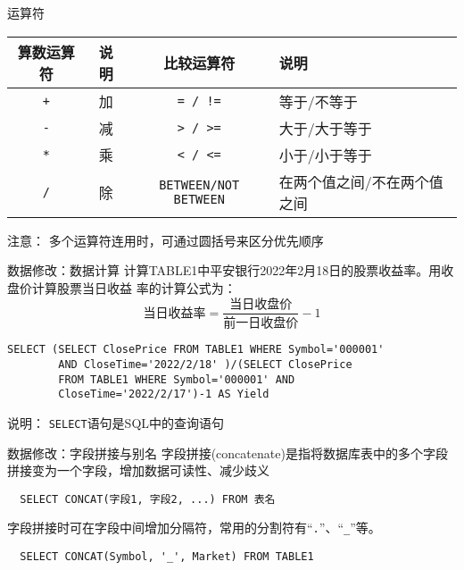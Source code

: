 \documentclass[t]{beamer}
\begin{document}
\begin{frame}[fragile]{运算符}
\begin{center}
\begin{tabular}{cccp{}}
  \hline
  算数运算符&说明&比较运算符&说明\\
  \hline
  \verb|+| &加&\verb|= / !=|& 等于/不等于\\
  \verb|-| &减&\verb|> / >=|& 大于/大于等于\\
  \verb|*| &乘&\verb|< / <=| &小于/小于等于\\
  \verb|/| &除&\verb|BETWEEN/NOT BETWEEN|& 在两个值之间/不在两个值之间  \\
  \hline
\end{tabular}
\end{center}

\begin{block}{注意：}
  多个运算符连用时，可通过圆括号来区分优先顺序
\end{block}
\end{frame}


\begin{frame}[fragile]{数据修改：数据计算}
  计算TABLE1中平安银行2022年2月18日的股票收益率。用收盘价计算股票当日收益
  率的计算公式为：
\[\text{当日收益率}=\frac{\text{当日收盘价}}{\text{前一日收盘价}}-1 \]
\begin{lstlisting}
SELECT (SELECT ClosePrice FROM TABLE1 WHERE Symbol='000001' 
        AND CloseTime='2022/2/18' )/(SELECT ClosePrice 
        FROM TABLE1 WHERE Symbol='000001' AND 
        CloseTime='2022/2/17')-1 AS Yield
\end{lstlisting}

\begin{block}{说明：}
\verb|SELECT|语句是SQL中的查询语句
\end{block}
\end{frame}

\begin{frame}[fragile]{数据修改：字段拼接与别名}
  字段拼接(concatenate)是指将数据库表中的多个字段拼接变为一个字段，增加数据可读性、减少歧义
\begin{lstlisting}
  SELECT CONCAT(字段1, 字段2, ...) FROM 表名
\end{lstlisting}

字段拼接时可在字段中间增加分隔符，常用的分割符有“\verb|.|”、“\verb|_|”等。
\begin{lstlisting}
  SELECT CONCAT(Symbol, '_', Market) FROM TABLE1
\end{lstlisting}
\end{frame}
\end{document}
